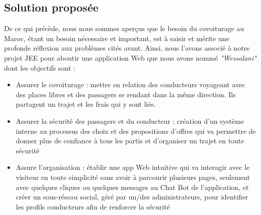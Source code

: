 \documentclass[a4paper]{report}
\begin{document}
\begin{spacing}{2}
\section{Solution proposée}

De ce qui précède, nous nous sommes aperçus que le besoin du covoiturage au Maroc, étant un besoin nécessaire et important, est à saisir et mérite une profonde réflexion aux problèmes cités avant. Ainsi, nous l'avons associé à notre projet JEE pour aboutir une application Web que nous avons nommé \textit{"Wessalani"} dont les objectifs sont :


\begin{itemize}
\item Assurer le covoiturage : mettre en relation des conducteurs voyageant avec des places libres et des passagers se rendant dans la même direction. Ils partagent un trajet et les frais qui y sont liés.
\item Assurer la sécurité des passagers et du conducteur : création d'un système interne au processus des choix et des propositions d'offres qui va permettre de donner plus de confiance à tous les partis et d'organiser un trajet en toute sécurité 
\item Assure l'organisation : établir une app Web intuitive qui va interagir avec le visiteur en toute simplicité sans avoir à parcourir plusieurs pages, seulement avec quelques cliques ou quelques messages au Chat Bot de l'application, et créer un sous-réseau social, géré par un/des administrateurs,
pour identifier les profils conducteurs afin de renforcer la sécurité 
\end{itemize}
\end{spacing}
\end{document}
